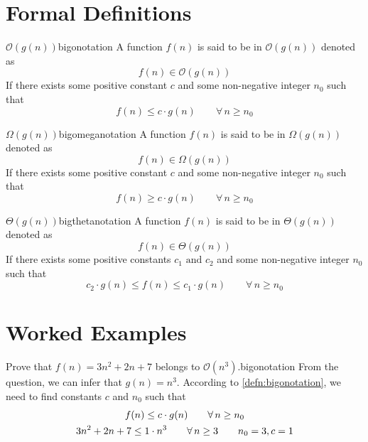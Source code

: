 \section{Formal Definitions}
\begin{definitiontcb}
    {\mbox{\(\mathcal{O}(g(n))\)}}{bigonotation}
    A function \mbox{\(f(n)\)} is said to be in \mbox{\(\mathcal{O}(g(n))\)} denoted as 
    \[
        f(n) \in \mathcal{O}(g(n))
    \]  
    If there exists some positive constant \mbox{\(c\)} and some non-negative integer \mbox{\(n_0\)} such that 
    \[
        f(n) \leq c \cdot g(n) \qquad \forall\, n\geq n_0
    \]
\end{definitiontcb}
\begin{definitiontcb}
    {\mbox{\(\Omega(g(n))\)}}{bigomeganotation}
    A function \mbox{\(f(n)\)} is said to be in \mbox{\(\Omega(g(n))\)} denoted as 
    \[
        f(n) \in \Omega(g(n))
    \]  
    If there exists some positive constant \mbox{\(c\)} and some non-negative integer \mbox{\(n_0\)} such that 
    \[
        f(n) \geq c \cdot g(n) \qquad \forall\, n\geq n_0
    \]
\end{definitiontcb}
\begin{definitiontcb}
    {\mbox{\(\Theta(g(n))\)}}{bigthetanotation}
    A function \mbox{\(f(n)\)} is said to be in \mbox{\(\Theta(g(n))\)} denoted as 
    \[
        f(n) \in \Theta(g(n))
    \]  
    If there exists some positive constants \mbox{\(c_1 \text{ and } c_2\)} and some non-negative integer \mbox{\(n_0\)} such that 
    \[
        c_2 \cdot g(n) \leq f(n) \leq c_1 \cdot g(n) \qquad \forall\, n\geq n_0
    \]
\end{definitiontcb}

\section{Worked Examples}
\begin{exampletcb}
    {Prove that \mbox{\(f(n) = 3n^2 + 2n + 7\)} belongs to \mbox{\(\mathcal{O}(n^3)\)}.}{bigonotation}
    From the question, we can infer that \mbox{\(g(n) = n^3\)}. According to \cref{defn:bigonotation}, we need to find constants \mbox{\(c\)} and \mbox{\(n_0\)} such that
    \begin{gather*}
        f(n) \leq c \cdot g(n) \qquad \forall\, n\geq n_0\\
        3n^2 + 2n + 7 \leq 1 \cdot n^3 \qquad \forall\, n\geq 3 \tag*{\mbox{\(n_0 = 3, c=1\)}}
    \end{gather*}
\end{exampletcb}

